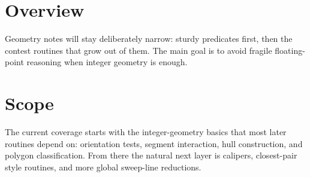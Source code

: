 \section*{Overview}

Geometry notes will stay deliberately narrow: sturdy predicates first, then the contest routines that grow out of
them. The main goal is to avoid fragile floating-point reasoning when integer geometry is enough.

\section*{Scope}

The current coverage starts with the integer-geometry basics that most later routines depend on: orientation tests,
segment interaction, hull construction, and polygon classification. From there the natural next layer is calipers,
closest-pair style routines, and more global sweep-line reductions.
